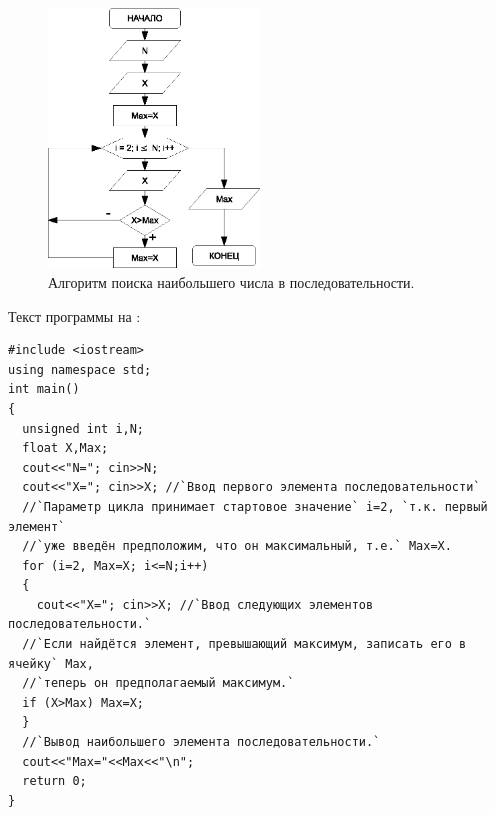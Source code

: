 \begin{figure}[htb]
\begin{center}
\includegraphics[width=0.5\textwidth]{img/ris_3_34}
\caption{Алгоритм поиска наибольшего числа в последовательности.}
\label{ch03:refDrawing33}
\end{center}
\end{figure}

Текст программы на :
\begin{lstlisting}
#include <iostream>
using namespace std;
int main()
{
  unsigned int i,N;
  float X,Max;
  cout<<"N="; cin>>N;
  cout<<"X="; cin>>X; //`Ввод первого элемента последовательности`
  //`Параметр цикла принимает стартовое значение` i=2, `т.к. первый элемент`
  //`уже введён предположим, что он максимальный, т.е.` Max=X.
  for (i=2, Max=X; i<=N;i++)
  {
    cout<<"X="; cin>>X; //`Ввод следующих элементов последовательности.`
  //`Если найдётся элемент, превышающий максимум, записать его в ячейку` Max, 
  //`теперь он предполагаемый максимум.`
  if (X>Max) Max=X;
  }
  //`Вывод наибольшего элемента последовательности.`
  cout<<"Max="<<Max<<"\n";
  return 0;
}
\end{lstlisting}



